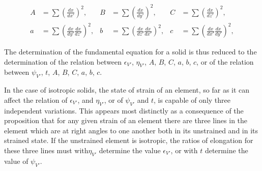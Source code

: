 \documentclass[12pt]{article}
\begin{document}
{\begin{align} 
A&= \sum \left( \frac{dx}{dx'} \right)^2,  &  B&= \sum \left( \frac{dx}{dy'} \right)^2,  & C&=  \sum \left( \frac{dx}{dz'} \right)^2, \label{418}\\
a&= \sum \left( \frac{dx}{dy'}\frac{dx}{dz'} \right)^2, &  b&= \sum \left( \frac{dx}{dz'}\frac{dx}{dx'} \right)^2,  & c&=  \sum \left( \frac{dx}{dx'}\frac{dx}{dy'} \right)^2,    \label{419}\end{align}


The determination of the fundamental equation for a solid is thus reduced to the determination of the relation between $\epsilon_{V'}$, $\eta_{V'}$, $A$, $B$, $C$, $a$, $b$, $c$, or of the relation between $\psi_{V'}$, $t$, $A$, $B$, $C$, $a$, $b$, $c$.


In the case of isotropic solids, the state of strain of an element, so far as it can affect the relation of $\epsilon_{V'}$, and $\eta_{V'}$, or of $\psi_{V'}$ and $t$, is capable of only three independent variations. This appears most distinctly as a consequence of the proposition that for any given strain of an element there are three lines in the element which are at right angles to one another both in its unstrained and in its strained state. If the unstrained element is isotropic, the ratios of elongation for these three lines must with$\eta_{V'}$ determine the value $\epsilon_{V'}$, or with $t$ determine the value of $\psi_{V'}$.


}
\end{document}
